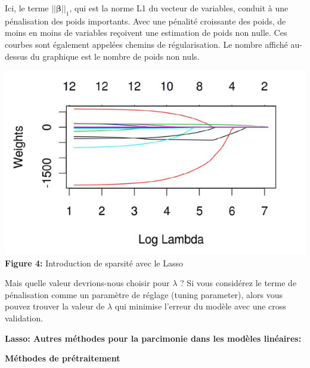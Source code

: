 Ici, le terme $||\boldsymbol{\beta}||_1$, qui est la norme L1 du vecteur de variables, conduit à une pénalisation des poids importants. Avec une pénalité croissante des poids, de moins en moins de variables reçoivent une estimation de poids non nulle. Ces courbes sont également appelées chemins de régularisation. Le nombre affiché au-dessus du graphique est le nombre de poids non nuls.

\begin{center}
    \includegraphics[width=0.7\linewidth]{Images/lasso.png} 
    \newline
    \textbf{Figure 4:} Introduction de sparsité avec le Lasso
\end{center}
Mais quelle valeur devrions-nous choisir pour $\lambda$ ? Si vous considérez le terme de pénalisation comme un paramètre de réglage (tuning parameter), alors vous pouvez trouver la valeur de $\lambda$ qui minimise l'erreur du modèle avec une cross validation.

\newline
\textbf{Lasso: Autres méthodes pour la parcimonie dans les modèles linéaires:}
\newline

\textbf{Méthodes de prétraitement}

